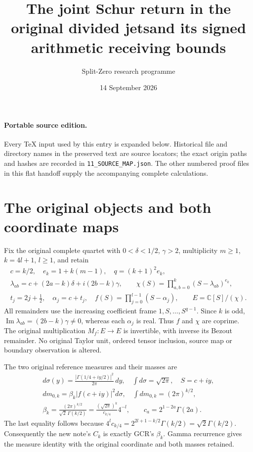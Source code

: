 \documentclass[11pt,a4paper]{article}
\title{The joint Schur return in the original divided jets\newline and its signed arithmetic receiving bounds}
\author{Split-Zero research programme}
\date{14 September 2026}
\newcommand{\C}{\mathbb C}
\begin{document}
\maketitle
\paragraph{Portable source edition.}
Every TeX input used by this entry is expanded below. Historical file
and directory names in the preserved text are source locators; the
exact origin paths and hashes are recorded in \texttt{11\_SOURCE\_MAP.json}.
The other numbered proof files in this flat handoff supply the
accompanying complete calculations.\par


\section{The original objects and both coordinate maps}

Fix the original complete quartet with
$0<\delta<1/2$, $\gamma>2$, multiplicity $m\geq1$,
$k=4l+1$, $l\geq1$, and retain
\[
\begin{gathered}
 c=k/2,\quad e_k=1+k(m-1),\quad q=(k+1)^2e_k,\\
 \lambda_{ab}=c+(2a-k)\delta+i(2b-k)\gamma,\qquad
 \chi(S)=\prod_{a,b=0}^k(S-\lambda_{ab})^{e_k},\\
 t_j=2j+\tfrac12,\quad\alpha_j=c+t_j,\quad
 f(S)=\prod_{j=0}^{l-1}(S-\alpha_j),\qquad
 E=\C[S]/(\chi).
\end{gathered}\tag{JSR1}
\]
All remainders use the increasing coefficient frame
$1,S,\ldots,S^{q-1}$. Since $k$ is odd,
$\operatorname{Im}\lambda_{ab}=(2b-k)\gamma\ne0$,
whereas each $\alpha_j$ is real. Thus $f$ and $\chi$ are coprime.
The original multiplication $M_f:E\to E$ is invertible, with
inverse its Bezout remainder. No original Taylor unit, ordered
tensor inclusion, source map or boundary observation is altered.

The two original reference measures and their masses are
\[
\begin{gathered}
 d\sigma(y)=\frac{|\Gamma(1/4+iy/2)|^2}{2\pi}\,dy,
 \quad\int d\sigma=\sqrt{2\pi},\quad S=c+iy,\\
 dm_{0,k}=\beta_k|f(c+iy)|^2d\sigma,
 \quad\int dm_{0,k}=(2\pi)^{k/2},\\
 \beta_k=\frac{(2\pi)^{k/2}}{\sqrt2\,\Gamma(k/2)}
        =\frac{(\sqrt{2\pi})^k}{c_{k/4}}4^{-l},
 \qquad c_a=2^{1-2a}\Gamma(2a).
\end{gathered}\tag{JSR2}
\]
The last equality follows because
$4^lc_{k/4}=2^{2l+1-k/2}\Gamma(k/2)=\sqrt2\Gamma(k/2)$.
Consequently the new note's $C_k$ is exactly GCR's $\beta_k$.
Gamma recurrence gives the measure identity with the original
coordinate and both masses retained.
\end{document}
